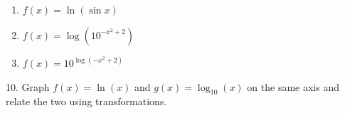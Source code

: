 \documentclass[10pt,]{book}
\theoremstyle{plain}
\theoremstyle{definition}
\theoremstyle{definition}
\theoremstyle{definition}
\numberwithin{equation}{section}
\begin{document}
\begin{exerciselist}
\begin{enumerate}[label=(\alph*)]
\item\hypertarget{li-277}{}\(f(x) = \ln \left( \sin x \right)\)%
\item\hypertarget{li-278}{}\(f(x) = \log \left( 10^{-x^2 + 2} \right)\)%
\item\hypertarget{li-279}{}\(f(x) = 10^{\log \left( -x^2 +2 \right)}\)%
\end{enumerate}
%
\par\smallskip
\item[10.]\hypertarget{exercise-100}{}\hypertarget{p-366}{}%
Graph \(f(x) = \ln \left( x \right)\) and \(g(x) = \log_{10} \left( x \right)\) on the same axis and relate the two using transformations.%
\par\smallskip
\end{exerciselist}
\typeout{************************************************}
\typeout{************************************************}
\end{document}
